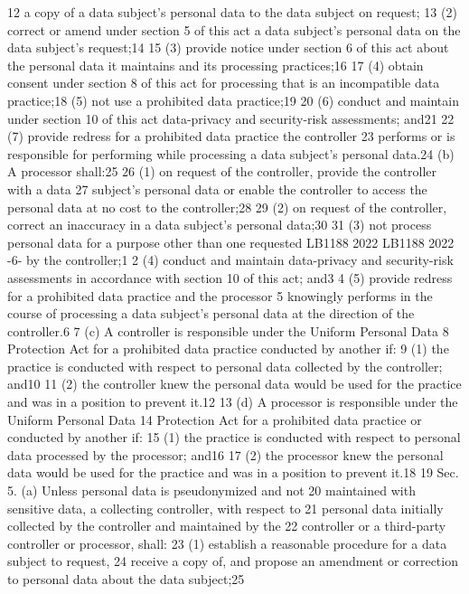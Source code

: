 12 a copy of a data subject's personal data to the data subject on request;
13 (2) correct or amend under section 5 of this act a data subject's
personal data on the data subject's request;14
15 (3) provide notice under section 6 of this act about the personal
data it maintains and its processing practices;16
17 (4) obtain consent under section 8 of this act for processing that
is an incompatible data practice;18
(5) not use a prohibited data practice;19
20 (6) conduct and maintain under section 10 of this act data-privacy
and security-risk assessments; and21
22 (7) provide redress for a prohibited data practice the controller
23 performs or is responsible for performing while processing a data
subject's personal data.24
(b) A processor shall:25
26 (1) on request of the controller, provide the controller with a data
27 subject's personal data or enable the controller to access the personal
data at no cost to the controller;28
29 (2) on request of the controller, correct an inaccuracy in a data
subject's personal data;30
31 (3) not process personal data for a purpose other than one requested
LB1188
2022
LB1188
2022
-6-
by the controller;1
2 (4) conduct and maintain data-privacy and security-risk assessments
in accordance with section 10 of this act; and3
4 (5) provide redress for a prohibited data practice and the processor
5 knowingly performs in the course of processing a data subject's personal
data at the direction of the controller.6
7 (c) A controller is responsible under the Uniform Personal Data
8 Protection Act for a prohibited data practice conducted by another if:
9 (1) the practice is conducted with respect to personal data
collected by the controller; and10
11 (2) the controller knew the personal data would be used for the
practice and was in a position to prevent it.12
13 (d) A processor is responsible under the Uniform Personal Data
14 Protection Act for a prohibited data practice or conducted by another if:
15 (1) the practice is conducted with respect to personal data
processed by the processor; and16
17 (2) the processor knew the personal data would be used for the
practice and was in a position to prevent it.18
19 Sec. 5. (a) Unless personal data is pseudonymized and not
20 maintained with sensitive data, a collecting controller, with respect to
21 personal data initially collected by the controller and maintained by the
22 controller or a third-party controller or processor, shall:
23 (1) establish a reasonable procedure for a data subject to request,
24 receive a copy of, and propose an amendment or correction to personal
data about the data subject;25
